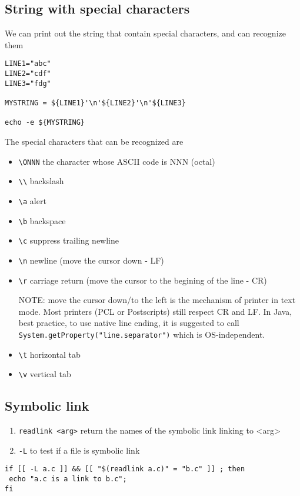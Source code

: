 \subsection{String with special characters}

We can print out the string that contain special characters, and can recognize
them
\begin{verbatim}
LINE1="abc"
LINE2="cdf"
LINE3="fdg"

MYSTRING = ${LINE1}'\n'${LINE2}'\n'${LINE3}

echo -e ${MYSTRING}
\end{verbatim}
The special characters that can be recognized are
\begin{itemize}
  \item \verb!\ONNN! the character whose ASCII code is NNN (octal)
  \item \verb!\\!  backslash
  \item \verb!\a! alert
  \item \verb!\b! backspace
  \item \verb!\c! suppress trailing newline
  \item \verb!\n! newline  (move the cursor down - LF)
  \item \verb!\r! carriage return  (move the cursor to the begining of the line
  - CR)
  
NOTE: move the cursor down/to the left is the mechanism of printer in text mode.
Most printers (PCL or Postscripts) still respect CR and LF. 
In Java, best practice, to use native line ending, it is suggested to call
\verb!System.getProperty("line.separator")! which is OS-independent.

  \item \verb!\t! horizontal tab
  \item \verb!\v! vertical tab
\end{itemize}

\subsection{Symbolic link}

\begin{enumerate}
  \item \verb!readlink <arg>! return the names of the symbolic link linking to <arg>
  \item \verb!-L! to test if a file is symbolic link 
\end{enumerate}

\begin{verbatim}
if [[ -L a.c ]] && [[ "$(readlink a.c)" = "b.c" ]] ; then 
 echo "a.c is a link to b.c";
fi
\end{verbatim}

